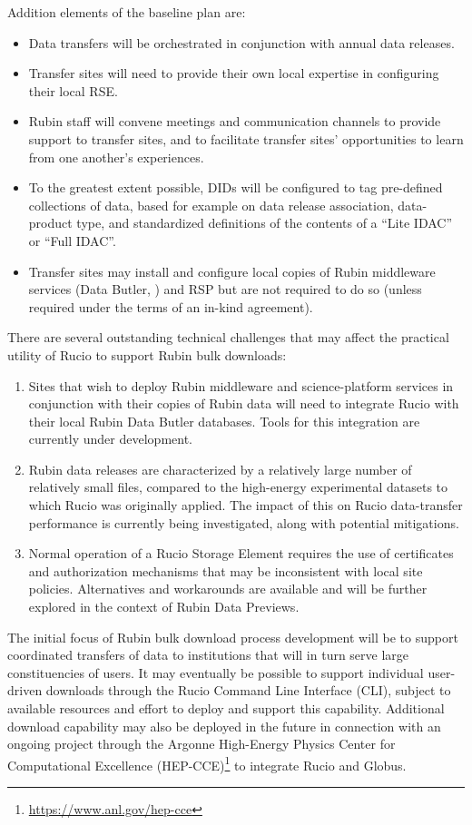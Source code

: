 Addition elements of the baseline plan are:
\begin{itemize}
\item Data transfers will be orchestrated in conjunction with annual data releases.
\item Transfer sites will need to provide their own local expertise in configuring their local RSE.
\item Rubin staff will convene meetings and communication channels to provide support to transfer sites, and to facilitate transfer sites' opportunities to learn from one another's experiences. 
\item To the greatest extent possible, DIDs will be configured to tag pre-defined collections of data, based for example on data release association, data-product type, and standardized definitions of the contents of a ``Lite IDAC'' or ``Full IDAC''.
\item Transfer sites may install and configure local copies of Rubin middleware services (Data Butler, ) and RSP but are not required to do so (unless required under the terms of an in-kind agreement).
\end{itemize}

There are several outstanding technical challenges that may affect the practical utility of Rucio to support Rubin bulk downloads:
\begin{enumerate}
\item Sites that wish to deploy Rubin middleware and science-platform services in conjunction with their copies of Rubin data will need to integrate Rucio with their local Rubin Data Butler databases. Tools for this integration are currently under development.
\item Rubin data releases are characterized by a relatively large number of relatively small files, compared to the high-energy experimental datasets to which Rucio was originally applied. The impact of this on Rucio data-transfer performance is currently being investigated, along with potential mitigations.
\item Normal operation of a Rucio Storage Element requires the use of certificates and authorization mechanisms that may be inconsistent with local site policies. Alternatives and workarounds are available and will be further explored in the context of Rubin Data Previews.
\end{enumerate}

The initial focus of Rubin bulk download process development will be to support coordinated transfers of data to institutions that will in turn serve large constituencies of users. It may eventually be possible to support individual user-driven downloads through the Rucio Command Line Interface (CLI), subject to available resources and effort to deploy and support this capability. Additional download capability may also be deployed in the future in connection with an ongoing project through the Argonne High-Energy Physics Center for Computational Excellence (HEP-CCE)\footnote{\url{https://www.anl.gov/hep-cce}} to integrate Rucio and Globus.

